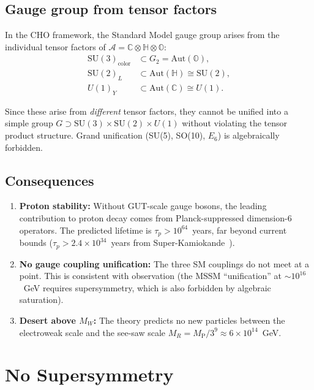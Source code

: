 \documentclass[12pt,a4paper]{article}
\theoremstyle{definition}
\theoremstyle{remark}
\newcommand{\Oct}{\mathbb{O}}
\newcommand{\Quat}{\mathbb{H}}
\newcommand{\Comp}{\mathbb{C}}
\newcommand{\Alg}{\mathcal{A}}
\newcommand{\SU}{\mathrm{SU}}
\newcommand{\MP}{M_{\mathrm{P}}}
\begin{document}
\subsection{Gauge group from tensor factors}

In the CHO framework, the Standard Model gauge group arises from the 
individual tensor factors of $\Alg = \Comp\otimes\Quat\otimes\Oct$:
\begin{align}
\SU(3)_{\mathrm{color}} &\subset G_2 = \mathrm{Aut}(\Oct), \\
\SU(2)_L &\subset \mathrm{Aut}(\Quat) \cong \SU(2), \\
U(1)_Y &\subset \mathrm{Aut}(\Comp) \cong U(1).
\end{align}

Since these arise from \emph{different} tensor factors, they cannot be 
unified into a simple group $G \supset \SU(3)\times\SU(2)\times U(1)$ 
without violating the tensor product structure. Grand unification (SU(5), 
SO(10), $E_6$) is algebraically forbidden.

\subsection{Consequences}

\begin{enumerate}
\item \textbf{Proton stability:} Without GUT-scale gauge bosons, the 
leading contribution to proton decay comes from Planck-suppressed 
dimension-6 operators. The predicted lifetime is 
$\tau_p > 10^{64}$~years, far beyond current bounds 
($\tau_p > 2.4\times 10^{34}$~years from Super-Kamiokande~\cite{SK2020}).

\item \textbf{No gauge coupling unification:} The three SM couplings do 
not meet at a point. This is consistent with observation (the MSSM 
``unification'' at $\sim 10^{16}$~GeV requires supersymmetry, which is 
also forbidden by algebraic saturation).

\item \textbf{Desert above $M_W$:} The theory predicts no new particles 
between the electroweak scale and the see-saw scale 
$M_R = \MP/3^9 \approx 6\times 10^{14}$~GeV.
\end{enumerate}

\section{No Supersymmetry}
\label{sec:susy}
\end{document}

